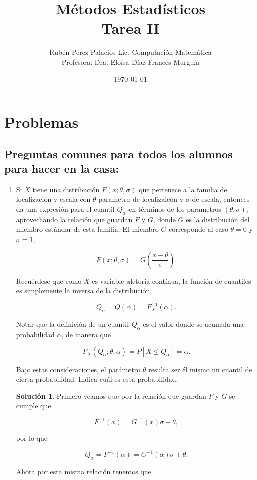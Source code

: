 \documentclass[letterpaper]{article}
\title{Métodos Estadísticos \\Tarea II}
\author{Rubén Pérez Palacios Lic. Computación Matemática\\Profesora: Dra. Eloísa Díaz Francés Murguía}
\date{\today}
\theoremstyle{definition}
\theoremstyle{lemathm}
\theoremstyle{lemathm}
\newtheorem{sol}{Solución}
\theoremstyle{lemathm}
\theoremstyle{lemademthm}
\newcommand{\pars}[1]{\left( #1 \right) }
\newcommand{\bracs}[1]{\left[ #1 \right] }
\newcommand{\1}{\mathbbm{1}}
\begin{document}
	\maketitle
    
    \section*{Problemas}

	\subsection*{Preguntas comunes para todos los alumnos para hacer en la casa:}

	\begin{enumerate}
		\item Si $X$ tiene una distribución $F(x; \theta, \sigma)$ que pertenece a la familia de localización y escala con $\theta$ parametro de localizaicón y $\sigma$ de escala, entonces da una expresión para el cuantil $Q_\alpha$ en términos de los parametros $(\theta,\sigma)$, aprovechando la relación que guardan $F$ y $G$, donde $G$ es la distribución del miembro estándar de esta familia. El miembro $G$ corresponde al caso $\theta = 0$ y $\sigma = 1$,
		
		\[F(x; \theta, \sigma) = G\pars{\frac{x-\theta}{\sigma}}.\]

		Recuérdese que como $X$ es variable aletoria contínua, la función de cuantiles es simplemente la inversa de la distribución,

		\[Q_\alpha = Q(\alpha) = F_X^{-1}(\alpha).\]

		Notar que la definición de un cuantil $Q_\alpha$ es el valor donde se acumula una probabilidad $\alpha$, de manera que

		\[F_X(Q_\alpha; \theta, \alpha) = P\bracs{X\leq Q_\alpha} = \alpha.\]

		Bajo estas consideraciones, el parámetro $\theta$ resulta ser él mismo un cuantil de cierta probabilidad. Indica cuál es esta probabilidad.

		\begin{sol}
			Primero veamos que por la relación que guardan $F$ y $G$ se cumple que

			\[F^{-1}(x) = G^{-1}(x)\sigma + \theta,\]

			por lo que

			\[Q_{\alpha} = F^{-1}(\alpha) = G^{-1}(\alpha)\sigma + \theta.\]

			Ahora por esta misma relación tenemos que


\end{sol}
\end{enumerate}
\end{document}
